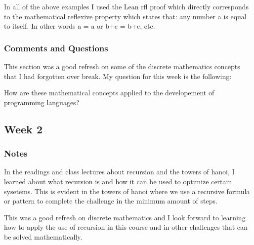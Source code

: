 \documentclass{article}
\theoremstyle{theorem}
\theoremstyle{definition}
\theoremstyle{remark}
\begin{document}
In all of the above examples I used the Lean rfl proof which directly corresponds to the mathematical reflexive property which states that:
any number a is equal to itself. In other words a = a or b+c = b+c, etc.


%
%

\subsubsection*{Comments and Questions}

This section was a good refresh on some of the discrete mathematics concepts that I had forgotten over break. My question for this week is the following:

How are these mathematical concepts applied to the developement of programming languages?


\subsection{Week 2}



\subsubsection*{Notes}

In the readings and class lectures about recursion and the towers of hanoi, I learned about what recursion is and how it can be used to optimize certain sysetems. This is evident in the towers of hanoi where we use a recursive formula or pattern to complete the challenge in the minimum amount of steps.

This was a good refresh on discrete mathematics and I look forward to learning how to apply the use of recursion in this course and in other challenges that can be solved mathematically.
\end{document}
